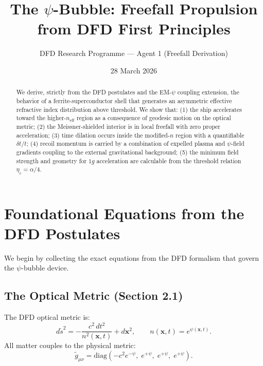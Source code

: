 \documentclass[12pt, letterpaper]{article}
\title{The $\psi$-Bubble: Freefall Propulsion from DFD First Principles}
\author{DFD Research Programme --- Agent 1 (Freefall Derivation)}
\date{28 March 2026}
\theoremstyle{definition}
\theoremstyle{remark}
\newcommand{\psifield}{\psi}
\newcommand{\neff}{n_{\mathrm{eff}}}
\newcommand{\etac}{\eta_c}
\begin{document}
\maketitle

\begin{abstract}
We derive, strictly from the DFD postulates and the EM-$\psi$ coupling extension,
the behavior of a ferrite-superconductor shell that generates an asymmetric
effective refractive index distribution above threshold. We show that: (1) the
ship accelerates toward the higher-$\neff$ region as a consequence of geodesic
motion on the optical metric; (2) the Meissner-shielded interior is in local
freefall with zero proper acceleration; (3) time dilation occurs inside the
modified-$n$ region with a quantifiable $\delta t/t$; (4) recoil momentum is
carried by a combination of expelled plasma and $\psi$-field gradients coupling
to the external gravitational background; (5) the minimum field strength and
geometry for $1g$ acceleration are calculable from the threshold relation
$\etac = \alpha/4$.
\end{abstract}

\tableofcontents

\section{Foundational Equations from the DFD Postulates}

We begin by collecting the exact equations from the DFD formalism that govern
the $\psi$-bubble device.

\subsection{The Optical Metric (Section 2.1)}

The DFD optical metric is:
\begin{equation}
d\tilde{s}^2 = -\frac{c^2 \, dt^2}{n^2(\mathbf{x},t)} + d\mathbf{x}^2,
\qquad n(\mathbf{x},t) = e^{\psifield(\mathbf{x},t)}.
\label{eq:optical-metric}
\end{equation}
All matter couples to the physical metric:
\begin{equation}
\tilde{g}_{\mu\nu} = \mathrm{diag}\!\left(-c^2 e^{-\psi},\; e^{+\psi},\; e^{+\psi},\; e^{+\psi}\right).
\label{eq:physical-metric}
\end{equation}
\end{document}
